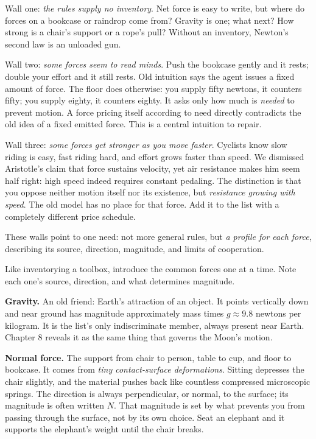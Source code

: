 Wall one: \emph{the rules supply no inventory}. Net force is easy to write, but where do forces on a bookcase or raindrop come from? Gravity is one; what next? How strong is a chair's support or a rope's pull? Without an inventory, Newton's second law is an unloaded gun.

Wall two: \emph{some forces seem to read minds}. Push the bookcase gently and it rests; double your effort and it still rests. Old intuition says the agent issues a fixed amount of force. The floor does otherwise: you supply fifty newtons, it counters fifty; you supply eighty, it counters eighty. It asks only how much is \emph{needed} to prevent motion. A force pricing itself according to need directly contradicts the old idea of a fixed emitted force. This is a central intuition to repair.

Wall three: \emph{some forces get stronger as you move faster}. Cyclists know slow riding is easy, fast riding hard, and effort grows faster than speed. We dismissed Aristotle's claim that force sustains velocity, yet air resistance makes him seem half right: high speed indeed requires constant pedaling. The distinction is that you oppose neither motion itself nor its existence, but \emph{resistance growing with speed}. The old model has no place for that force. Add it to the list with a completely different price schedule.

These walls point to one need: not more general rules, but \emph{a profile for each force}, describing its source, direction, magnitude, and limits of cooperation.


Like inventorying a toolbox, introduce the common forces one at a time. Note each one's source, direction, and what determines magnitude.

\textbf{Gravity.} An old friend: Earth's attraction of an object. It points vertically down and near ground has magnitude approximately mass times \(g\approx9.8\) newtons per kilogram. It is the list's only indiscriminate member, always present near Earth. Chapter 8 reveals it as the same thing that governs the Moon's motion.

\textbf{Normal force.} The support from chair to person, table to cup, and floor to bookcase. It comes from \emph{tiny contact-surface deformations}. Sitting depresses the chair slightly, and the material pushes back like countless compressed microscopic springs. The direction is always perpendicular, or normal, to the surface; its magnitude is often written \(N\). That magnitude is set by what prevents you from passing through the surface, not by its own choice. Seat an elephant and it supports the elephant's weight until the chair breaks.

